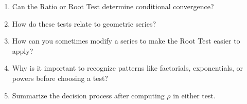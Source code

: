 \begin{enumerate}
\item Can the Ratio or Root Test determine conditional convergence?

\item How do these tests relate to geometric series?

\item How can you sometimes modify a series to make the Root Test easier to apply?

\item Why is it important to recognize patterns like factorials, exponentials, or powers before choosing a test?

\item Summarize the decision process after computing $\rho$ in either test.

\end{enumerate}

